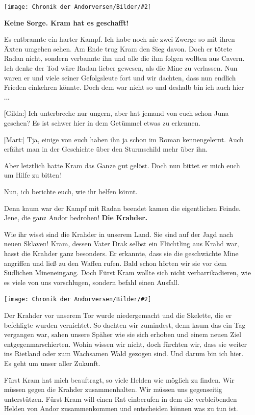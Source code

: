 \documentclass[10pt, a4paper, oneside]{book}
\newcommand{\bildmitts}[2][height=0.32\textwidth,width=0.48\textwidth,keepaspectratio]{%
    \begin{center}
        \texttt{[image: Chronik der Andorversen/Bilder/\#2]}
    \end{center}
}
\begin{document}
\begin{multicols}{2}
\bildmitts{AA2016 Treffen mit Mart und Juna 3.jpeg}

\textbf{Keine Sorge. Kram hat es geschafft!}

Es entbrannte ein harter Kampf. Ich habe noch nie zwei Zwerge so mit ihren Äxten umgehen sehen. Am Ende trug Kram den Sieg davon. Doch er tötete Radan nicht, sondern verbannte ihn und alle die ihm folgen wollten aus Cavern. Ich denke der Tod wäre Radan lieber gewesen, als die Mine zu verlassen. Nun waren er und viele seiner Gefolgsleute fort und wir dachten, dass nun endlich Frieden einkehren könnte. Doch dem war nicht so und deshalb bin ich auch hier ...


[Gilda:] Ich unterbreche nur ungern, aber hat jemand von euch schon Juna gesehen? Es ist schwer hier in dem Getümmel etwas zu erkennen.

[Mart:] Tja, einige von euch haben ihn ja schon im Roman kennengelernt. Auch erfährt man in der Geschichte über den Sturmschild mehr über ihn.

Aber letztlich hatte Kram das Ganze gut gelöst. Doch nun bittet er mich euch um Hilfe zu bitten!

Nun, ich berichte euch, wie ihr helfen könnt.

Denn kaum war der Kampf mit Radan beendet kamen die eigentlichen Feinde. Jene, die ganz Andor bedrohen! \textbf{Die Krahder.}


Wie ihr wisst sind die Krahder in unserem Land. Sie sind auf der Jagd nach neuen Sklaven! Kram, dessen Vater Drak selbst ein Flüchtling aus Krahd war, hasst die Krahder ganz besonders. Er erkannte, dass sie die geschwächte Mine angriffen und ließ zu den Waffen rufen. Bald schon hörten wir sie vor dem Südlichen Mineneingang. Doch Fürst Kram wollte sich nicht verbarrikadieren, wie es viele von uns vorschlugen, sondern befahl einen Ausfall.

\bildmitts{AA2016 Treffen mit Mart und Juna 4.jpeg}

Der Krahder vor unserem Tor wurde niedergemacht und die Skelette, die er befehligte wurden vernichtet. So dachten wir zumindest, denn kaum das ein Tag vergangen war, sahen unsere Späher wie sie sich erhoben und einem neuen Ziel entgegenmarschierten. Wohin wissen wir nicht, doch fürchten wir, dass sie weiter ins Rietland oder zum Wachsamen Wald gezogen sind. Und darum bin ich hier. Es geht um unser aller Zukunft.

Fürst Kram hat mich beauftragt, so viele Helden wie möglich zu finden. Wir müssen gegen die Krahder zusammenhalten. Wir müssen uns gegenseitig unterstützen. Fürst Kram will einen Rat einberufen in dem die verbleibenden Helden von Andor zusammenkommen und entscheiden können was zu tun ist.


\end{multicols}
\end{document}
